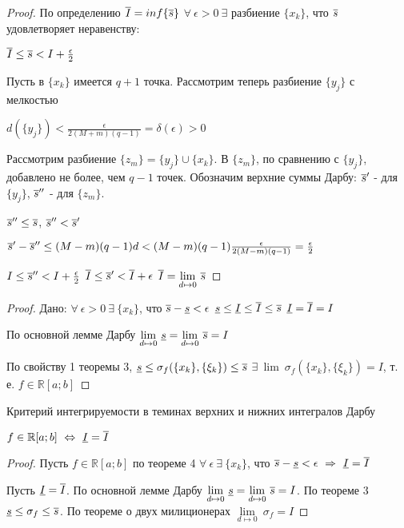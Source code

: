 \begin{proof}
По определению $\overline{I}=inf\{\overline{s}\}$ \then $\forall\ \epsilon>0\ \exists$ разбиение $\{x_k\}$, что $\overline{s}$ удовлетворяет неравенству:

$\overline{I}\leq\overline{s}<I+\frac\epsilon2$

Пусть в $\{x_k\}$ имеется $q+1$ точка. Рассмотрим теперь разбиение $\{y_j\}$ с мелкостью

$d(\{y_j\})<\frac\epsilon{2(M+m)(q-1)}=\delta(\epsilon)>0$

Рассмотрим разбиение $\{z_m\}=\{y_j\}\cup\{x_k\}$. В $\{z_m\}$, по сравнению с $\{y_j\}$, добавлено не более, чем $q-1$ точек. Обозначим верхние суммы Дарбу: $\overline{s}'$ - для $\{y_j\}$, $\overline{s}''$ - для $\{z_m\}$.

$\overline{s}''\leq\overline{s}$, $\overline{s}''<\overline{s}'$

$\overline{s}'-\overline{s}''\leq(M-m)(q-1)d<(M-m)(q-1)\frac\epsilon{2(M-m)(q-1)}=\frac\epsilon2$

$I\leq\overline{s}''<I+\frac\epsilon2$ \then $\overline{I}\leq\overline{s}'<\overline{I}+\epsilon$ \then $\overline{I}=\underset{d\mapsto0}{\lim}\ \overline{s}$
\end{proof}
\begin{proof}

Дано: $\forall\ \epsilon>0\ \exists\ \{x_k\}$, что $\overline{s}-\underline{s}<\epsilon$ \then $\underline{s}\leq\underline{I}\leq\overline{I}\leq\overline{s}$ \then $\underline{I}=\overline{I}=I$

По основной лемме Дарбу $\underset{d\mapsto0}{\lim}\ \ns=\underset{d\mapsto0}{\lim}\ \vs=I$

По свойству 1 теоремы 3, $\underline{s}\leq\sigma_f(\{x_k\},\{\xi_k\})\leq\overline{s}$ \then $\exists\ \lim\ \sigma_f(\{x_k\},\{\xi_k\})=I$, т. е. $f\in\mathbb{R}[a;b]$
\end{proof}
\begin{theor}Критерий интегрируемости в теминах верхних и нижних интегралов Дарбу

$f\in\mathbb{R}[a;b]\ \Leftrightarrow\ \nis=\vis$
\end{theor}
\begin{proof}

Пусть $f\in\mathbb{R}[a;b]$ \then по теореме 4 $\forall\ \epsilon\ \exists\ \{x_k\}$, что $\vs-\ns<\epsilon\ \Rightarrow\ \nis=\vis$


Пусть $\underline{I}=\overline{I}$. По основной лемме Дарбу $\underset{d\mapsto0}{\lim}\ \ns=\underset{d\mapsto0}{\lim}\ \vs=I$. По теореме 3 $\underline{s}\leq\sigma_f\leq\overline{s}$. По теореме о двух милиционерах $\underset{d\mapsto0}{\lim}\ \sigma_f=I$
\end{proof}
